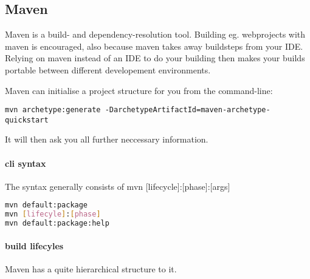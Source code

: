 \subsection{Maven}

Maven is a build- and dependency-resolution tool. Building eg. webprojects with maven is encouraged, also because maven takes away buildsteps from your IDE. Relying on maven instead of an IDE to do your building then makes your builds portable between different developement environments. 

Maven can initialise a project structure for you from the command-line:
\begin{verbatim}
mvn archetype:generate -DarchetypeArtifactId=maven-archetype-quickstart
\end{verbatim} 
It will then ask you all further neccessary information. 

\paragraph{cli syntax} 
The syntax generally consists of mvn [lifecycle]:[phase]:[args]

\begin{lstlisting}[language=bash]
mvn default:package
mvn [lifecyle]:[phase]
mvn default:package:help
\end{lstlisting}
		
		
\paragraph{build lifecyles} 

Maven has a quite hierarchical structure to it. 

